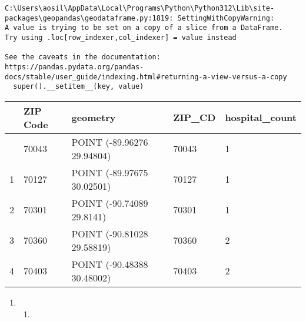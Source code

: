 \documentclass[
  letterpaper,
  DIV=11,
  numbers=noendperiod]{scrartcl}
\providecommand{\tightlist}{%
  \setlength{\itemsep}{0pt}\setlength{\parskip}{0pt}}\usepackage{longtable,booktabs,array}
\begin{document}
\begin{verbatim}
C:\Users\aosil\AppData\Local\Programs\Python\Python312\Lib\site-packages\geopandas\geodataframe.py:1819: SettingWithCopyWarning: 
A value is trying to be set on a copy of a slice from a DataFrame.
Try using .loc[row_indexer,col_indexer] = value instead

See the caveats in the documentation: https://pandas.pydata.org/pandas-docs/stable/user_guide/indexing.html#returning-a-view-versus-a-copy
  super().__setitem__(key, value)
\end{verbatim}

\begin{longtable}[]{@{}lllll@{}}
\toprule\noalign{}
& ZIP Code & geometry & ZIP\_CD & hospital\_count \\
\midrule\noalign{}
\endhead
\bottomrule\noalign{}
\endlastfoot
0 & 70043 & POINT (-89.96276 29.94804) & 70043 & 1 \\
1 & 70127 & POINT (-89.97675 30.02501) & 70127 & 1 \\
2 & 70301 & POINT (-90.74089 29.8141) & 70301 & 1 \\
3 & 70360 & POINT (-90.81028 29.58819) & 70360 & 2 \\
4 & 70403 & POINT (-90.48388 30.48002) & 70403 & 2 \\
\end{longtable}

\begin{enumerate}
\def\labelenumi{\arabic{enumi}.}
\setcounter{enumi}{3}
\tightlist
\item
  \begin{enumerate}
  \def\labelenumii{\alph{enumii}.}
  \tightlist
  \item
  \end{enumerate}
\end{enumerate}
\end{document}
